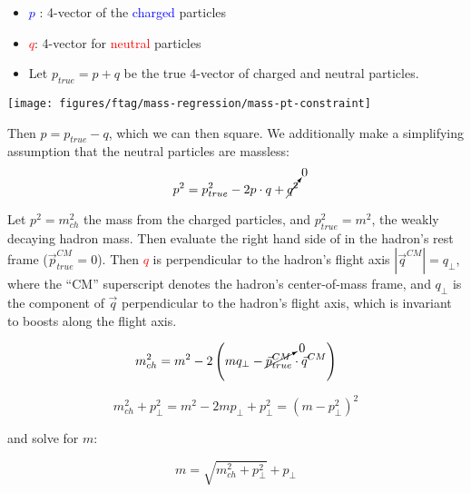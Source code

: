 \begin{minipage}{0.6\textwidth}
\begin{itemize}
	\item \textcolor{blue}{$p$}	: 4-vector of the \textcolor{blue}{charged} particles
	\item \textcolor{red}{$q$}: 4-vector for \textcolor{red}{neutral} particles
	\item Let $p_{true} = p + q$ be the true 4-vector of charged and neutral particles. 
\end{itemize}

\hspace{0.03\textwidth}
\end{minipage}
\begin{minipage}{0.35\textwidth}
\texttt{[image: figures/ftag/mass-regression/mass-pt-constraint]}
\end{minipage}

Then $p = p_{true} -q$, which we can then square. We additionally make a simplifying assumption that the neutral particles are massless:
\begin{equation}
p^2 = p_{true}^2 - 2 p \cdot q + \cancelto{0}{q^2}
\label{eq:chg-neutral}
\end{equation}

Let $p^2 = m_{ch}^2$ the mass from the charged particles, and $p_{true}^2 = m^2$, the weakly decaying hadron mass. 
Then evaluate the right hand side of \Eq{\ref{eq:chg-neutral}} in the hadron's rest frame ($\vec{p}_{true}^{CM} = 0$).  Then \textcolor{red}{$q$} is perpendicular to the hadron's flight axis $|\vec{q}^{CM}| = q_\perp$, where the ``CM'' superscript denotes the hadron's center-of-mass frame, and $q_\perp$ is the component of $\vec{q}$ perpendicular to the hadron's flight axis, which is invariant to boosts along the flight axis.

\begin{equation}
m_{ch}^2 = m^2 - 2 \left( m q_\perp - \cancelto{0}{\vec{p}_{true}^{CM}} \cdot \vec{q}^{CM} \right)
\end{equation}

\begin{equation}
m_{ch}^2 + p_\perp^2 = m^2 - 2 m p_\perp + p_\perp^2 = (m - p_\perp^2)^2
\end{equation}

and solve for $m$:

\begin{equation}
m = \sqrt{m_{ch}^2 + p_\perp^2} + p_\perp
\label{eq:mass-neutrals}
\end{equation}

